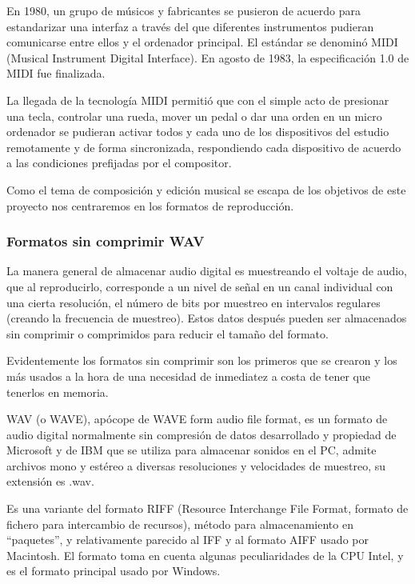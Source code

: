 \documentclass[a4paper,11pt,oneside]{book}
\begin{document}
En 1980, un grupo de músicos y fabricantes se pusieron de acuerdo para estandarizar una interfaz a través del que diferentes instrumentos pudieran comunicarse entre ellos y el ordenador principal. El estándar se denominó MIDI (Musical Instrument Digital Interface). En agosto de 1983, la especificación 1.0 de MIDI fue finalizada.

La llegada de la tecnología MIDI permitió que con el simple acto de presionar una tecla, controlar una rueda, mover un pedal o dar una orden en un micro ordenador se pudieran activar todos y cada uno de los dispositivos del estudio remotamente y de forma sincronizada, respondiendo cada dispositivo de acuerdo a las condiciones prefijadas por el compositor.

Como el tema de composición y edición musical se escapa de los objetivos de este proyecto nos centraremos en los formatos de reproducción.

\subsubsection{Formatos sin comprimir WAV}
La manera general de almacenar audio digital es muestreando el voltaje de audio, que al reproducirlo, corresponde a un nivel de señal en un canal individual con una cierta resolución, el número de bits por muestreo en intervalos regulares (creando la frecuencia de muestreo). Estos datos después pueden ser almacenados sin comprimir o comprimidos para reducir el tamaño del formato.

Evidentemente los formatos sin comprimir son los primeros que se crearon y los más usados a la hora de una necesidad de inmediatez a costa de tener que tenerlos en memoria.

WAV (o WAVE), apócope de WAVE form audio file format, es un formato de audio digital normalmente sin compresión de datos desarrollado y propiedad de Microsoft y de IBM que se utiliza para almacenar sonidos en el PC, admite archivos mono y estéreo a diversas resoluciones y velocidades de muestreo, su extensión es .wav.

Es una variante del formato RIFF (Resource Interchange File Format, formato de fichero para intercambio de recursos), método para almacenamiento en ``paquetes'', y relativamente parecido al IFF y al formato AIFF usado por Macintosh. El formato toma en cuenta algunas peculiaridades de la CPU Intel, y es el formato principal usado por Windows.
\end{document}
